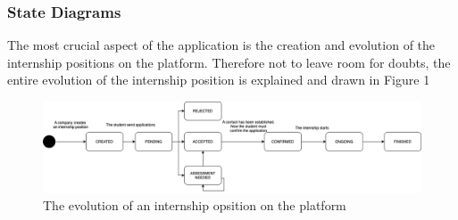 \subsubsection{State Diagrams}
The most crucial aspect of the application is the creation and evolution of the internship positions on the platform. Therefore not to leave room for doubts, the entire evolution of the internship position is explained and drawn in Figure 1
\begin{figure}[h!]
    \centering
    \includegraphics[width=1\textwidth]{RASD/Images/InternshipProcess.png}
    \caption{The evolution of an internship opsition on the platform}
    \label{fig:example}
\end{figure}




